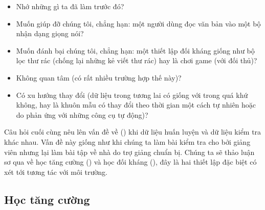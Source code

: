 \documentclass[letterpaper,11pt,english]{sphinxmanual}
\begin{document}
\begin{itemize}
\item {} 
Nhớ những gì ta đã làm trước đó?

\item {} 
Muốn giúp đỡ chúng tôi, chẳng hạn: một người dùng đọc văn bản vào một
bộ nhận dạng giọng nói?

\item {} 
Muốn đánh bại chúng tôi, chẳng hạn: một thiết lập đối kháng giống như
bộ lọc thư rác (chống lại những kẻ viết thư rác) hay là chơi game
(với đối thủ)?

\item {} 
Không quan tâm (có rất nhiều trường hợp thế này)?

\item {} 
Có xu hướng thay đổi (dữ liệu trong tương lai có giống với trong quá
khứ không, hay là khuôn mẫu có thay đổi theo thời gian một cách tự
nhiên hoặc do phản ứng với những công cụ tự động)?

\end{itemize}



Câu hỏi cuối cùng nêu lên vấn đề về 
() khi dữ liệu huấn luyện và dữ liệu kiểm tra khác
nhau. Vấn đề này giống như khi chúng ta làm bài kiểm tra cho bởi giảng
viên nhưng lại làm bài tập về nhà do trợ giảng chuẩn bị. Chúng ta sẽ
thảo luận sơ qua về học tăng cường () và học đối
kháng (), đây là hai thiết lập đặc biệt có xét tới
tương tác với môi trường.








\subsection{Học tăng cường}
\label{\detokenize{chapter_introduction/index_vn:hoc-tang-cuong}}
\end{document}
